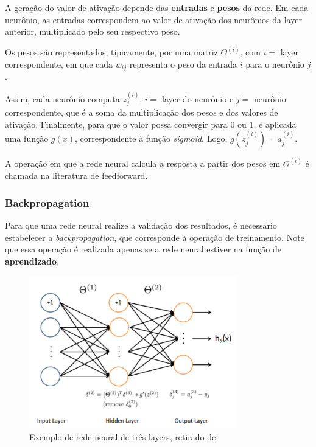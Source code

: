             A geração do valor de ativação depende das \textbf{entradas} e \textbf{pesos} da rede. Em cada neurônio, as entradas correspondem ao valor de ativação dos neurônios da layer anterior, multiplicado pelo seu respectivo peso. 

            Os pesos são representados, tipicamente, por uma matriz $\Theta^{(i)}$, com $i =$ layer correspondente, em que cada $w_{ij}$ representa o peso da entrada $i$ para o neurônio $j$.

            Assim, cada neurônio computa $z^{(i)}_j$, $i =$ layer do neurônio e $j =$ neurônio correspondente, que é a soma da multiplicação dos pesos e dos valores de ativação. Finalmente, para que o valor possa convergir para $0$ ou $1$, é aplicada uma função $g(x)$, correspondente à função \textit{sigmoid}. Logo, $g(z^{(i)}_j) = a^{(i)}_j$.

            A operação em que a rede neural calcula a resposta a partir dos pesos em $\Theta^{(i)}$ é chamada na literatura de feedforward. 

        \subsubsection{Backpropagation}
            Para que uma rede neural realize a validação dos resultados, é necessário estabelecer a \textit{backpropagation}, que corresponde à operação de treinamento. Note que essa operação é realizada apenas se a rede neural estiver na função de \textbf{aprendizado}.

            \begin{figure}[ht!]
              \centering
              \includegraphics[width=9cm]{figures/nn_model_back}
              \caption{Exemplo de rede neural de três layers, retirado de \cite{MLC}}
              \label{fig:arch}
            \end{figure}

